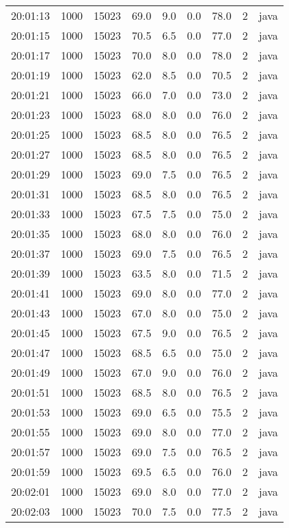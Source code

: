 \documentclass[11pt]{article}
\begin{document}
\begin{table}[htbp]
\begin{tabular}{rrrrrrrrl}
20:01:13 & 1000 & 15023 & 69.0 & 9.0 & 0.0 & 78.0 & 2 & java\\
20:01:15 & 1000 & 15023 & 70.5 & 6.5 & 0.0 & 77.0 & 2 & java\\
20:01:17 & 1000 & 15023 & 70.0 & 8.0 & 0.0 & 78.0 & 2 & java\\
20:01:19 & 1000 & 15023 & 62.0 & 8.5 & 0.0 & 70.5 & 2 & java\\
20:01:21 & 1000 & 15023 & 66.0 & 7.0 & 0.0 & 73.0 & 2 & java\\
20:01:23 & 1000 & 15023 & 68.0 & 8.0 & 0.0 & 76.0 & 2 & java\\
20:01:25 & 1000 & 15023 & 68.5 & 8.0 & 0.0 & 76.5 & 2 & java\\
20:01:27 & 1000 & 15023 & 68.5 & 8.0 & 0.0 & 76.5 & 2 & java\\
20:01:29 & 1000 & 15023 & 69.0 & 7.5 & 0.0 & 76.5 & 2 & java\\
20:01:31 & 1000 & 15023 & 68.5 & 8.0 & 0.0 & 76.5 & 2 & java\\
20:01:33 & 1000 & 15023 & 67.5 & 7.5 & 0.0 & 75.0 & 2 & java\\
20:01:35 & 1000 & 15023 & 68.0 & 8.0 & 0.0 & 76.0 & 2 & java\\
20:01:37 & 1000 & 15023 & 69.0 & 7.5 & 0.0 & 76.5 & 2 & java\\
20:01:39 & 1000 & 15023 & 63.5 & 8.0 & 0.0 & 71.5 & 2 & java\\
20:01:41 & 1000 & 15023 & 69.0 & 8.0 & 0.0 & 77.0 & 2 & java\\
20:01:43 & 1000 & 15023 & 67.0 & 8.0 & 0.0 & 75.0 & 2 & java\\
20:01:45 & 1000 & 15023 & 67.5 & 9.0 & 0.0 & 76.5 & 2 & java\\
20:01:47 & 1000 & 15023 & 68.5 & 6.5 & 0.0 & 75.0 & 2 & java\\
20:01:49 & 1000 & 15023 & 67.0 & 9.0 & 0.0 & 76.0 & 2 & java\\
20:01:51 & 1000 & 15023 & 68.5 & 8.0 & 0.0 & 76.5 & 2 & java\\
20:01:53 & 1000 & 15023 & 69.0 & 6.5 & 0.0 & 75.5 & 2 & java\\
20:01:55 & 1000 & 15023 & 69.0 & 8.0 & 0.0 & 77.0 & 2 & java\\
20:01:57 & 1000 & 15023 & 69.0 & 7.5 & 0.0 & 76.5 & 2 & java\\
20:01:59 & 1000 & 15023 & 69.5 & 6.5 & 0.0 & 76.0 & 2 & java\\
20:02:01 & 1000 & 15023 & 69.0 & 8.0 & 0.0 & 77.0 & 2 & java\\
20:02:03 & 1000 & 15023 & 70.0 & 7.5 & 0.0 & 77.5 & 2 & java\\

\end{tabular}
\end{table}
\end{document}
